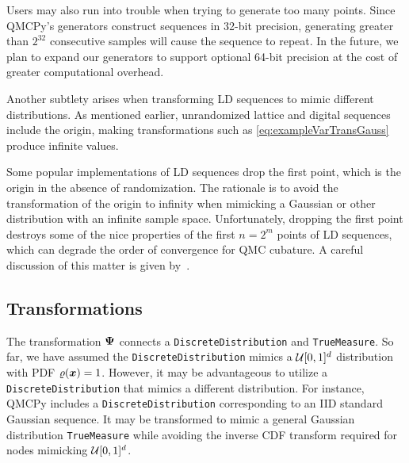 \documentclass[graybox,footinfo]{svmult}
\begin{document}
Users may also run into trouble when trying to generate too many points. Since QMCPy's generators construct sequences in 32-bit precision, generating greater than $2^{32}$ consecutive samples will cause the sequence to repeat. In the future, we plan to expand our generators to support optional 64-bit precision at the cost of greater computational overhead.

Another subtlety arises when transforming LD sequences to mimic different distributions. As mentioned earlier, unrandomized lattice and digital sequences include the origin, making transformations such as \eqref{eq:exampleVarTransGauss} produce infinite values.  

Some popular implementations of LD sequences drop the first point, which is the origin in the absence of randomization.  The rationale is to avoid the transformation of the origin to infinity when mimicking a Gaussian or other distribution with an infinite sample space.  Unfortunately, dropping the first point destroys some of the nice properties of the first $n = 2^m$ points of LD sequences, which can degrade the order of convergence for QMC cubature. A careful  discussion of this matter is given by~\cite{owen2020dropping}.

\subsection{Transformations}

The transformation ${\boldsymbol{\Psi}}$  connects a \texttt{DiscreteDistribution} and \texttt{TrueMeasure}. So far, we have assumed the \texttt{DiscreteDistribution} mimics a ${\mathcal{U}}[0,1]^d$ distribution with PDF $\varrho({\boldsymbol{x}})=1$. However, it may be advantageous to utilize a \texttt{DiscreteDistribution} that mimics a different distribution. For instance, QMCPy includes a \texttt{DiscreteDistribution} corresponding to an IID standard Gaussian sequence.  It may be transformed to mimic a general Gaussian distribution \texttt{TrueMeasure} while avoiding the inverse CDF transform required for nodes mimicking ${\mathcal{U}}[0,1]^d$. 
\end{document}

